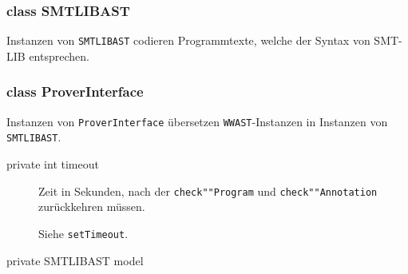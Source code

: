 \subsubsection{class SMTLIBAST}%

Instanzen von \texttt{SMTLIBAST} codieren Programmtexte, welche der
Syntax von SMT-LIB entsprechen.%

\subsubsection{class ProverInterface}%

Instanzen von \texttt{ProverInterface} übersetzen
\texttt{WWAST}-Instanzen in Instanzen von \texttt{SMTLIBAST}.%


\begin{description}%
    \item [private int timeout]

    Zeit in Sekunden, nach der \texttt{check""Program} und
    \texttt{check""Annotation} zurückkehren müssen.%

    Siehe \texttt{setTimeout}.%

    \item [private SMTLIBAST model]%

\end{description}%


